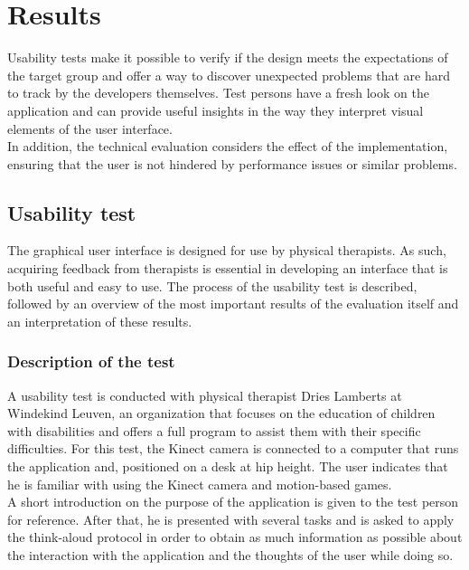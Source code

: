 \chapter{Results}

Usability tests make it possible to verify if the design meets the expectations of the target group and offer a way to discover unexpected problems that are hard to track by the developers themselves. Test persons have a fresh look on the application and can provide useful insights in the way they interpret visual elements of the user interface.\\

In addition, the technical evaluation considers the effect of the implementation, ensuring that the user is not hindered by performance issues or similar problems.


\section{Usability test}

The graphical user interface is designed for use by physical therapists. As such, acquiring feedback from therapists is essential in developing an interface that is both useful and easy to use. The process of the usability test is described, followed by an overview of the most important results of the evaluation itself and an interpretation of these results.


\subsection{Description of the test}

A usability test is conducted with physical therapist Dries Lamberts at Windekind Leuven, an organization that focuses on the education of children with disabilities and offers a full program to assist them with their specific difficulties. For this test, the Kinect camera is connected to a computer that runs the application and, positioned on a desk at hip height. The user indicates that he is familiar with using the Kinect camera and motion-based games.\\

A short introduction on the purpose of the application is given to the test person for reference. After that, he is presented with several tasks and is asked to apply the think-aloud protocol in order to obtain as much information as possible about the interaction with the application and the thoughts of the user while doing so.\\

